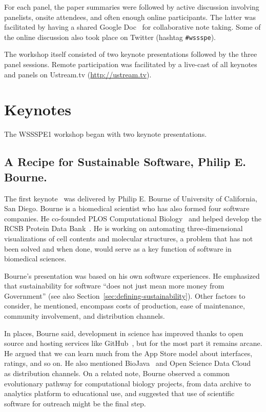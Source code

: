 \documentclass[11pt, oneside]{amsart}
\newcommand{\note}[1]{ {\textcolor{red}    { #1 }}}
\begin{document}
For each panel, the paper summaries were followed by active discussion
involving panelists, onsite attendees, and often enough online
participants. The latter was facilitated by having a shared Google
Doc~\cite{WSSSPE1-google-notes} for collaborative note taking. Some of
the online discussion also took place on Twitter (hashtag
\texttt{\#wssspe}).

The workshop itself consisted of two keynote presentations followed by the
three panel sessions.  Remote participation was
facilitated by a live-cast of all keynotes and panels on Ustream.tv (\url{http://ustream.tv}). 

\section{Keynotes } \label{sec:keynotes} %

The WSSSPE1 workshop began with two keynote presentations.

\subsection{A Recipe for Sustainable Software, Philip E. Bourne.} \label{sec:keynote1}

The first keynote~\cite{WSSSPE1-keynote1} was delivered by Philip
E. Bourne of University of California, San Diego.  Bourne is a
biomedical scientist who has also formed four software companies. He co-founded
PLOS Computational Biology~\cite{plos-web} and helped develop the RCSB
Protein Data Bank~\cite{pdb-web}.
He is working on automating three-dimensional visualizations of cell
contents and molecular structures, a problem that has not been solved
and when done, would serve as a key function of software in biomedical
sciences.

Bourne's  presentation was based on his own software experiences.  He emphasized that
sustainability for software ``does not just mean more money from
Government'' (see also Section~\ref{sec:defining-sustainability}).  Other
factors to consider, he mentioned, encompass costs of production, ease
of maintenance, community involvement, and distribution channels.

In places, Bourne said, development in science has improved thanks to
open source and hosting services like GitHub~\cite{github-web}, but
for the most part it
remains arcane. He argued that we can learn much from the App Store
model about interfaces, ratings, and so on. He also mentioned
BioJava~\cite{biojava-web} and Open Science Data Cloud~\cite{osdc-web}
as distribution channels.  On a related note, Bourne observed a common
evolutionary pathway for computational biology projects, from data
archive to analytics platform to educational use, and suggested that
use of scientific software for outreach might be the final step.
\end{document}
